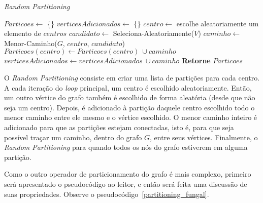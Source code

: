 \begin{algorithm}                   %
	\caption{\textit{Random Partitioning}}          %
	\label{partitioning_random}                           %
	\begin{algorithmic}                    %
		\newline
		\State $Particoes \gets $ \{\}
		\State $verticesAdicionados \gets $ \{\}
		\Repeat
			\State $centro \gets $ escolhe aleatoriamente um elemento de $centros$
			\State $candidato \gets $ Seleciona-Aleatoriamente($V$) 
			\State $caminho \gets $ Menor-Caminho($G$, $centro$, $candidato$)
			\State $Particoes(centro) \gets Particoes(centro)\ \cup caminho$
			\State $verticesAdicionados \gets verticesAdicionados\ \cup caminho$
		\State \textbf{Retorne} $Particoes$
		\EndProcedure
	\end{algorithmic}
\end{algorithm}

O \textit{Random Partitioning} consiste em criar uma lista de partições para 
cada centro. A cada iteração do \textit{loop} principal, um centro é escolhido 
aleatoriamente. Então, um outro vértice do grafo também é escolhido de forma 
aleatória (desde que não seja um centro). Depois, é adicionado à partição 
daquele centro escolhido todo o menor caminho entre ele mesmo e o vértice 
escolhido. O menor caminho inteiro é adicionado para que as partições estejam 
conectadas, isto é, para que seja possível traçar um caminho, dentro do grafo 
$G$, entre seus vértices. Finalmente, o \textit{Random Partitioning} para quando 
todos os nós do grafo estiverem em alguma partição.

Como o outro operador de particionamento do grafo é mais complexo, primeiro 
será apresentado o pseudocódigo ao leitor, e então será feita uma discussão 
de suas propriedades. Observe o pseudocódigo~\ref{partitioning_fungal}.

